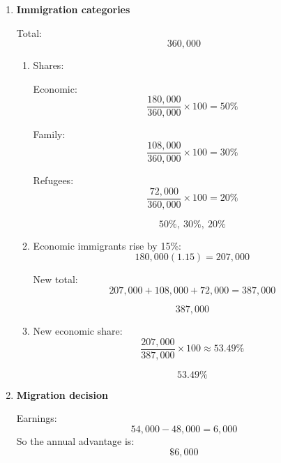 \documentclass[12pt]{article}
\begin{document}
\begin{enumerate}
\begin{enumerate}[label=(\alph*)]
    \[
    \boxed{0.45}
    \]

    \item Interpretation:

    Of the total log wage gap of 0.63, 0.18 is explained by measured differences in schooling and experience. The remaining 0.45 is unexplained and may reflect discrimination or omitted variables.
\end{enumerate}

\section*{Part VIII: Immigration}

\item \textbf{Immigration categories}

Total:
\[
360{,}000
\]

\begin{enumerate}[label=(\alph*)]
    \item Shares:

    Economic:
    \[
    \frac{180{,}000}{360{,}000}\times 100=50\%
    \]

    Family:
    \[
    \frac{108{,}000}{360{,}000}\times 100=30\%
    \]

    Refugees:
    \[
    \frac{72{,}000}{360{,}000}\times 100=20\%
    \]

    \[
    \boxed{50\%,\ 30\%,\ 20\%}
    \]

    \item Economic immigrants rise by 15\%:
    \[
    180{,}000(1.15)=207{,}000
    \]

    New total:
    \[
    207{,}000+108{,}000+72{,}000=387{,}000
    \]

    \[
    \boxed{387{,}000}
    \]

    \item New economic share:
    \[
    \frac{207{,}000}{387{,}000}\times 100\approx 53.49\%
    \]

    \[
    \boxed{53.49\%}
    \]
\end{enumerate}


\item \textbf{Migration decision}

Earnings:
\[
54{,}000-48{,}000=6{,}000
\]
So the annual advantage is:
\[
\boxed{\$6{,}000}
\]


\end{enumerate}
\end{document}
